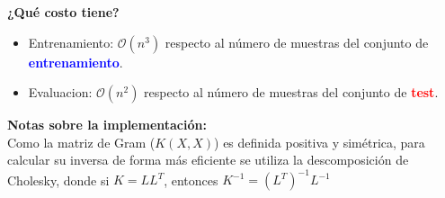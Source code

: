 {\begin{minipage}{\linewidth}
\textbf{¿Qué costo tiene?} 
\begin{itemize}
	\item Entrenamiento: $\mathcal{O}(n^3)$ respecto al número de muestras del conjunto de \textcolor{blue}{\textbf{entrenamiento}}.
	\item Evaluacion: $\mathcal{O}(n^2)$ respecto al número de muestras del conjunto de \textcolor{red}{\textbf{test}}.
\end{itemize}

\textbf{Notas sobre la implementación:}\\
Como la matriz de Gram ($K(X,X)$) es definida positiva y simétrica, para calcular su inversa de forma más eficiente se utiliza la descomposición de Cholesky, donde si $K=LL^T$, entonces $K^{-1}=(L^T)^{-1}L^{-1}$


\end{minipage}}
